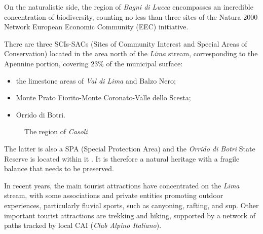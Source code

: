 \documentclass[sustainability,article,submit,pdftex,moreauthors]{Definitions/mdpi}
\begin{document}
On the naturalistic side, the region of \emph{Bagni di Lucca} encompasses an incredible concentration of biodiversity, counting no less than three sites of the Natura 2000 Network \cite{nat00} European Economic Community (EEC) initiative.

There are three SCIs-SACs (Sites of Community Interest and Special Areas of Conservation) located in the area north of the \emph{Lima} stream, corresponding to the Apennine portion, covering 23\% of the municipal surface:
\begin {itemize}
\item the limestone areas of \emph{Val di Lima} and Balzo Nero; 
\item Monte Prato Fiorito-Monte Coronato-Valle dello
Scesta; 
\item Orrido di Botri.
\end{itemize}


\begin{figure}
\hfill
{}
\hfill
{}
\caption[The region of \emph{Casoli}]{The region of \emph{Casoli}}
\label{fig:toscana-casoli}
\end{figure}

The latter is also a SPA (Special Protection Area) and the \textit{Orrido di Botri} State Reserve is located within it \cite{nat00}. It is therefore a natural heritage with a fragile balance that needs to be preserved.

In recent years, the main tourist attractions have concentrated on the \emph{Lima} stream, with some associations and private entities promoting outdoor experiences, particularly fluvial sports, such as canyoning, rafting, and sup. Other important tourist attractions are trekking and hiking, supported by a network of paths tracked by local CAI (\textit{Club Alpino Italiano}).
\end{document}
